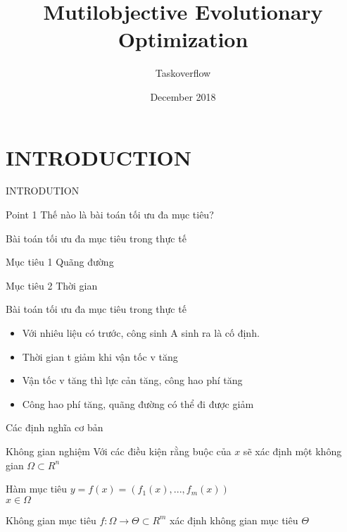 \documentclass{beamer}
\title{Mutilobjective Evolutionary Optimization}
\author{Taskoverflow}
\date{December 2018}
\begin{document}
\begin{frame}
    \titlepage
\end{frame}
\section[Outline]{}
\begin{frame}   
    \tableofcontents
\end{frame}
\section{INTRODUCTION}
\begin{frame}{INTRODUTION}
    \begin{block}{Point 1}
        Thế nào là bài toán tối ưu đa mục tiêu?
    \end{block}
\end{frame}
\begin{frame}{Bài toán tối ưu đa mục tiêu trong thực tế}
    \begin{block}{Mục tiêu 1}
        Quãng đường
    \end{block}
    \begin{block}{Mục tiêu 2}
        Thời gian
    \end{block}
\end{frame}
\begin{frame}{Bài toán tối ưu đa mục tiêu trong thực tế}
    \begin{itemize}
        \item <1-> Với nhiêu liệu có trước, công sinh A sinh ra là cố định.
        \item <2-> Thời gian t giảm khi vận tốc v tăng
        \item <3-> Vận tốc v tăng thì lực cản tăng, công hao phí tăng 
        \item <4-> Công hao phí tăng, quãng đường có thể đi được giảm
    \end{itemize}
\end{frame}
\begin{frame}{Các định nghĩa cơ bản}
    \begin{block}{Không gian nghiệm}
        Với các điều kiện rằng buộc của $x$ sẽ xác định một không gian $\Omega \subset R^{n}$
    \end{block}
    \pause
    \begin{block}{Hàm mục tiêu}
             $y = f(x)= (f_{1}(x),...,f_{m}(x))$
             \\$ x \in \Omega $
    \end{block}
    \pause
    \begin{block}{Không gian mục tiêu}
        $f : \Omega \to \Theta  \subset R^{m}$ xác định không gian mục tiêu $\Theta$
    \end{block}
\end{frame}
\end{document}
